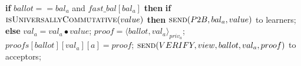 \begin{algorithm}
\begin{algorithmic}[1]
		\State
		\State \textbf{if} $ballot == bal_a$ and $fast\_bal[bal_a]$ \textbf{then}
		\State \hspace{\algorithmicindent} \textbf{if} $\Call{isUniversallyCommutative}{value}$ \textbf{then}
		\State \hspace{\algorithmicindent}\hspace{\algorithmicindent} $\Call{send}{P2B,bal_a, value}$ to learners;
		\State \hspace{\algorithmicindent} \textbf{else}
		\State \hspace{\algorithmicindent}\hspace{\algorithmicindent} $val_a = val_a \bullet value$;
		\State \hspace{\algorithmicindent}\hspace{\algorithmicindent} $proof = \langle ballot, val_a \rangle_{priv_a}$;
		\State \hspace{\algorithmicindent}\hspace{\algorithmicindent} $proofs[ballot][val_a][a] = proof$;
		\State \hspace{\algorithmicindent}\hspace{\algorithmicindent} $\Call{send}{VERIFY, view, ballot, val_a, proof}$ to acceptors;
		\EndFunction
	\end{algorithmic}
\end{algorithm}

